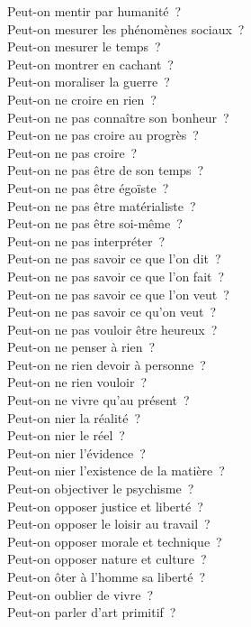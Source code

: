\documentclass[a4paper,12pt]{article}
\begin{document}
Peut-on mentir par humanité ? \\
Peut-on mesurer les phénomènes sociaux ? \\
Peut-on mesurer le temps ? \\
Peut-on montrer en cachant ? \\
Peut-on moraliser la guerre ? \\
Peut-on ne croire en rien ? \\
Peut-on ne pas connaître son bonheur ? \\
Peut-on ne pas croire au progrès ? \\
Peut-on ne pas croire ? \\
Peut-on ne pas être de son temps ? \\
Peut-on ne pas être égoïste ? \\
Peut-on ne pas être matérialiste ? \\
Peut-on ne pas être soi-même ? \\
Peut-on ne pas interpréter ? \\
Peut-on ne pas savoir ce que l'on dit ? \\
Peut-on ne pas savoir ce que l'on fait ? \\
Peut-on ne pas savoir ce que l'on veut ? \\
Peut-on ne pas savoir ce qu'on veut ? \\
Peut-on ne pas vouloir être heureux ? \\
Peut-on ne penser à rien ? \\
Peut-on ne rien devoir à personne ? \\
Peut-on ne rien vouloir ? \\
Peut-on ne vivre qu'au présent ? \\
Peut-on nier la réalité ? \\
Peut-on nier le réel ? \\
Peut-on nier l'évidence ? \\
Peut-on nier l'existence de la matière ? \\
Peut-on objectiver le psychisme ? \\
Peut-on opposer justice et liberté ? \\
Peut-on opposer le loisir au travail ? \\
Peut-on opposer morale et technique ? \\
Peut-on opposer nature et culture ? \\
Peut-on ôter à l'homme sa liberté ? \\
Peut-on oublier de vivre ? \\
Peut-on parler d'art primitif ? \\
\end{document}
